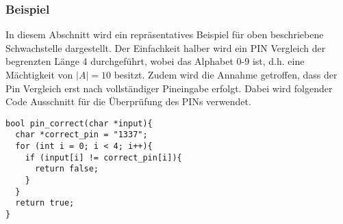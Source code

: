 \documentclass[a4paper,
DIV=13,
12pt,
BCOR=10mm,
department=FakIM,
oneside,
parskip=half,
automark,
listof=totocnumbered,
bibliography=totocnumbered,
acronym=totocnumbered
] {OTHRartcl}
\begin{document}
\subsubsection{Beispiel}
In diesem Abschnitt wird ein repräsentatives Beispiel für oben beschriebene Schwachstelle dargestellt.
Der Einfachkeit halber wird ein PIN Vergleich der begrenzten Länge 4 durchgeführt, wobei das Alphabet 0-9 ist, d.h. eine Mächtigkeit von $|A| = 10$ besitzt.
Zudem wird die Annahme getroffen, dass der Pin Vergleich erst nach vollständiger Pineingabe erfolgt. Dabei
wird folgender Code Ausschnitt für die Überprüfung des PINs verwendet.
\begin{verbatim}
bool pin_correct(char *input){
  char *correct_pin = "1337";
  for (int i = 0; i < 4; i++){
    if (input[i] != correct_pin[i]){
      return false;
    }
  }
  return true;
}
\end{verbatim}
\end{document}
